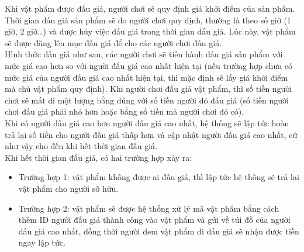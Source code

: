 \documentclass[a4paper]{article}
\begin{document}
Khi vật phẩm được đấu giá, người chơi sẽ quy định giá khởi điểm của sản phẩm. Thời gian đấu giá sản phẩm sẽ do người chơi quy định, thường là theo số giờ (1 giờ, 2 giờ…) và được hủy việc đấu giá trong thời gian đấu giá. Lúc này, vật phẩm sẽ được đăng lên mục đấu giá để cho các người chơi đấu giá. \\

Hình thức đấu giá như sau, các người chơi sẽ tiến hành đấu giá sản phẩm với mức giá cao hơn so với người đấu giá cao nhất hiện tại (nếu trường hợp chưa có mức giá của người đấu giá cao nhất hiện tại, thì mặc định sẽ lấy giá khởi điểm mà chủ vật phẩm quy định). Khi người chơi đấu giá vật phẩm, thì số tiền người chơi sẽ mất đi một lượng bằng đúng với số tiền người đó đấu giá (số tiền người chơi đấu giá phải nhỏ hơn hoặc bằng số tiền mà người chơi đó có). \\

Khi có người đấu giá cao hơn người đấu giá cao nhất, hệ thống sẽ lập tức hoàn trả lại số tiền cho người đấu giá thấp hơn và cập nhật người đấu giá cao nhất, cứ như vậy cho đến khi hết thời gian đấu giá. \\



Khi hết thời gian đấu giá, có hai trường hợp xảy ra: 
\begin{itemize}
    \item Trường hợp 1: vật phẩm không được ai đấu giá, thì lập tức hệ thống sẽ trả lại vật phẩm cho người sỡ hữu. 
    \item Trường hợp 2: vật phẩm sẽ được hệ thống xử lý mã vật phẩm bằng cách thêm ID người đấu giá thành công vào vật phẩm và gửi về túi đồ của người đấu giá cao nhất, đồng thời người đem vật phẩm đi đấu giá sẽ nhận được tiền ngay lập tức.
\end{itemize}
\end{document}
